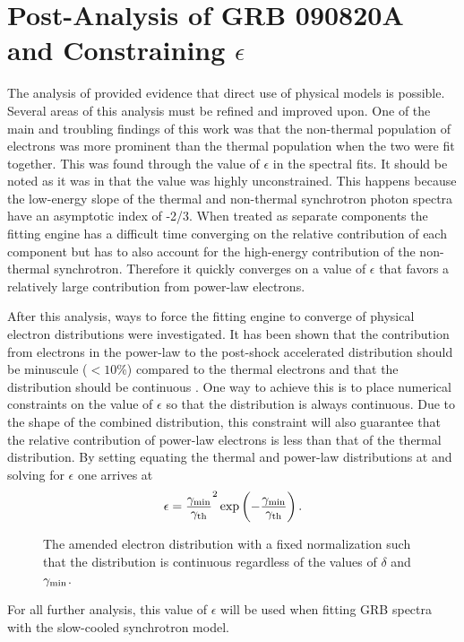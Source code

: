 \section{Post-Analysis of GRB 090820A and Constraining $\epsilon$}
\label{sec:epsdisc}
The analysis of \cite{Burgess:2012} provided evidence that direct use
of physical models is possible. Several areas of this analysis must be
refined and improved upon. One of the main and troubling findings of
this work was that the non-thermal population of electrons was more
prominent than the thermal population when the two were fit
together. This was found through the value of $\epsilon$ in the
spectral fits. It should be noted as it was in \cite{Burgess:2012}
that the value was highly unconstrained. This happens because the
low-energy slope of the thermal and non-thermal synchrotron photon
spectra have an asymptotic index of -2/3. When treated as separate
components the fitting engine has a difficult time converging on the
relative contribution of each component but has to also account for
the high-energy contribution of the non-thermal synchrotron. Therefore
it quickly converges on a value of $\epsilon$ that favors a relatively
large contribution from power-law electrons.

After this analysis, ways to force the fitting engine to converge of
physical electron distributions were investigated. It has been shown
that the contribution from electrons in the power-law to the
post-shock accelerated distribution should be minuscule ($<10$\%)
compared to the thermal electrons and that the distribution should be
continuous \cite{Spitkovsky:2008}. One way to achieve this is to place
numerical constraints on the value of $\epsilon$ so that the
distribution is always continuous. Due to the shape of the combined
distribution, this constraint will also guarantee that the relative
contribution of power-law electrons is less than that of the thermal
distribution.  By setting equating the thermal and power-law
distributions at and solving for $\epsilon$ one arrives at
\begin{equation}
  \label{eq:epsnorm}
  \epsilon = \dover{\gammaMin}{\gamth}^2 \exp\left(-\dover{\gammaMin}{\gamth}\right).
\end{equation}
\begin{figure}[h!]
  \centering
  \caption{The amended electron distribution with a fixed normalization such that the distribution is continuous regardless of the values of $\delta$ and $\gamma_{\rm min}$.}
  \label{fig:fixeps}
\end{figure}
For all further analysis, this value of $\epsilon$ will be used when
fitting GRB spectra with the slow-cooled synchrotron model.




























